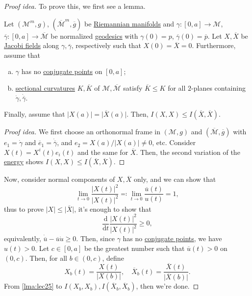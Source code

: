 \begin{proof}[Proof idea]
	To prove this, we first see a lemma.

	\begin{lemma}\label{lma:lec25}
		Let \((\mathcal{M}^m , g)\), \((\overline{\mathcal{M}}^m , \overline{g})\) be \hyperref[def:Riemannian-manifold]{Riemannian manifolds} and \(\gamma \colon [0, a] \to \mathcal{M} \), \(\overline{\gamma} \colon [0, a] \to \overline{\mathcal{M}} \) be normalized \hyperref[def:geodesic]{geodesics} with \(\gamma (0) = p\), \(\overline{\gamma} (0) = \overline{p} \). Let \(X, \overline{X} \) be \hyperref[def:Jacobi-field]{Jacobi fields} along \(\gamma , \overline{\gamma} \), respectively such that \(X(0) = \overline{X} = 0\). Furthermore, assume that
		\begin{enumerate}[(a)]
			\item \(\gamma \) has no \hyperref[def:conjugate-point]{conjugate points} on \([0, a]\);
			\item \hyperref[def:sectional-curvature]{sectional curvatures} \(K , \overline{K} \) of \(\mathcal{M} , \overline{\mathcal{M}} \) satisfy \(\overline{K} \leq K \) for all \(2\)-planes containing \(\dot{\gamma }, \dot{\overline{\gamma } } \).
		\end{enumerate}
		Finally, assume that \(\vert X(a) \vert = \vert \overline{X} (a) \vert \). Then, \(I(X, X) \leq I(\overline{X} , \overline{X} )\).
	\end{lemma}
	\begin{proof}[Proof idea]
		We first choose an orthonormal frame in \((\mathcal{M} , g)\) and \((\overline{\mathcal{M}} , \overline{g} )\) with \(e_1 = \dot{\gamma } \) and \(\overline{e} _1 = \dot{\overline{\gamma } } \), and \(e_2 = X(a) / \vert X(a) \vert \neq 0\), etc. Consider \(X(t) = X^i(t) e_i(t)\) and the same for \(\overline{X} \). Then, the second variation of the \hyperref[def:energy]{energy} shows \(I(X, X) \leq I(\overline{X} , \overline{X} )\).
	\end{proof}

	Now, consider normal components of \(X, \overline{X} \) only, and we can show that
	\[
		\lim_{t \to 0} \frac{\vert X(t) \vert ^2}{\vert X(t) \vert ^2} \eqqcolon \lim_{t \to 0} \frac{\overline{u} (t)}{u(t)}= 1,
	\]
	thus to prove \(\vert X \vert \leq \vert \overline{X} \vert \), it's enough to show that
	\[
		\frac{\mathrm{d}}{\mathrm{d}t} \frac{\vert X(t) \vert ^2}{\vert X(t) \vert ^2} \geq 0,
	\]
	equivalently, \(\dot{\overline{u} } - \overline{u} \dot{u} \geq 0 \). Then, since \(\gamma \) has no \hyperref[def:conjugate-point]{conjugate points}, we have \(u(t) > 0\). Let \(c\in [0, a]\) be the greatest number such that \(\overline{u} (t) > 0\) on \((0, c)\). Then, for all \(b\in (0, c)\), define
	\[
		X_b (t) = \frac{X(t)}{\vert X(b) \vert },\quad \overline{X} _b(t) = \frac{\overline{X} (t)}{\vert \overline{X} (b) \vert }.
	\]
	From \autoref{lma:lec25} to \(I(X_b, X_b) , I(\overline{X} _b , \overline{X} _b)\), then we're done.
\end{proof}

